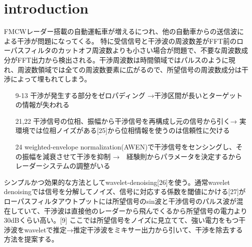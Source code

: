 \section{introduction}
FMCWレーダー搭載の自動運転車が増えるにつれ、他の自動車からの送信波による干渉が問題になってくる。
特に受信信号と干渉波の周波数差がFFT前のローパスフィルタのカットオフ周波数よりも小さい場合が問題で、不要な周波数成分がFFT出力から検出される。干渉周波数は時間領域ではパルスのように現れ、周波数領域では全ての周波数要素に広がるので、所望信号の周波数成分は干渉によって埋もれてしまう。 

\begin{itemize}
    \item [9-13] 干渉が発生する部分をゼロパディング →干渉区間が長いとターゲットの情報が失われる
    \item [21,22] 干渉信号の位相、振幅から干渉信号を再構成し元の信号から引く→ 実環境では位相ノイズがある[25]から位相情報を使うのは信頼性に欠ける
    \item [24] weighted-envelope normalization(AWEN)で干渉信号をセンシングし、その振幅を減衰させて干渉を抑制 →　経験則からパラメータを決定するからレーダーシステムの調整がいる 
\end{itemize}
シンプルかつ効果的な方法としてwavelet-denoising[26]を使う。通常wavelet denoisingでは信号を分解してノイズ、信号に対応する係数を閾値にかける[27]がローパスフィルタアウトプットには所望信号のsin波と干渉信号のパルス波が混在していて、干渉波は直接他のレーダーから飛んでくるから所望信号の電力より30dBくらい高い。[9]
ここでは所望信号をノイズに見立てて、強い電力をもつ干渉波をwaveletで推定→推定干渉波をミキサー出力から引いて、干渉を除去する方法を提案する。
        
        